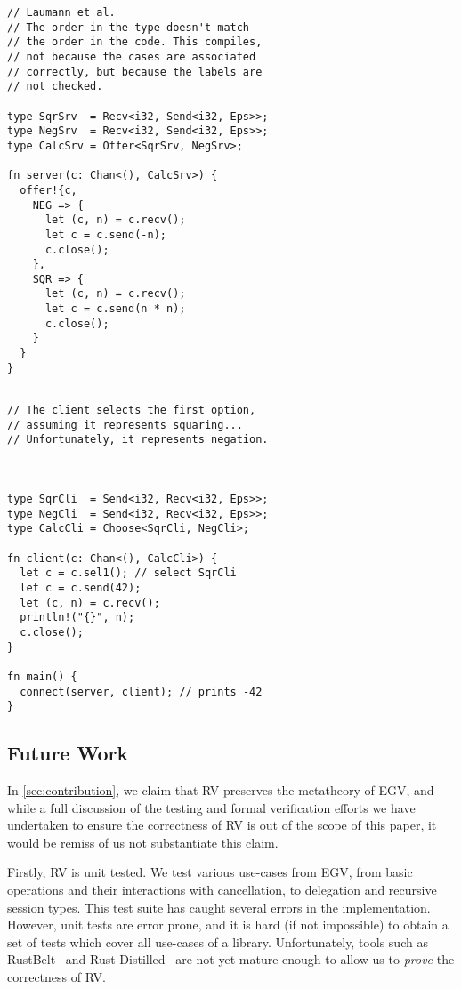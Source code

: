 \documentclass[copyright,creativecommons]{eptcs}
\begin{document}
\vspace{-0.5\baselineskip}
\begin{minipage}[t]{0.5\linewidth}
\begin{lstlisting}
// Laumann et al.
// The order in the type doesn't match
// the order in the code. This compiles,
// not because the cases are associated
// correctly, but because the labels are
// not checked.

type SqrSrv  = Recv<i32, Send<i32, Eps>>;
type NegSrv  = Recv<i32, Send<i32, Eps>>;
type CalcSrv = Offer<SqrSrv, NegSrv>;

fn server(c: Chan<(), CalcSrv>) {
  offer!{c,
    NEG => {
      let (c, n) = c.recv();
      let c = c.send(-n);
      c.close();
    },
    SQR => {
      let (c, n) = c.recv();
      let c = c.send(n * n);
      c.close();
    }
  }
}
\end{lstlisting}
\end{minipage}%
\begin{minipage}[t]{0.5\linewidth}
\begin{lstlisting}

// The client selects the first option,
// assuming it represents squaring...
// Unfortunately, it represents negation.



type SqrCli  = Send<i32, Recv<i32, Eps>>;
type NegCli  = Send<i32, Recv<i32, Eps>>;
type CalcCli = Choose<SqrCli, NegCli>;

fn client(c: Chan<(), CalcCli>) {
  let c = c.sel1(); // select SqrCli
  let c = c.send(42);
  let (c, n) = c.recv();
  println!("{}", n);
  c.close();
}

fn main() {
  connect(server, client); // prints -42
}
\end{lstlisting}
\end{minipage}


\subsection{Future Work}\label{sec:future-work}
In \cref{sec:contribution}, we claim that RV preserves the metatheory of EGV, and while a full discussion of the testing and formal verification efforts we have undertaken to ensure the correctness of RV is out of the scope of this paper, it would be remiss of us not substantiate this claim.

Firstly, RV is unit tested. We test various use-cases from EGV, from basic operations and their interactions with cancellation, to delegation and recursive session types. This test suite has caught several errors in the implementation. However, unit tests are error prone, and it is hard (if not impossible) to obtain a set of tests which cover all use-cases of a library. Unfortunately, tools such as RustBelt~\cite{jung2017} and Rust Distilled~\cite{weiss2018} are not yet mature enough to allow us to \emph{prove} the correctness of RV.
\end{document}
